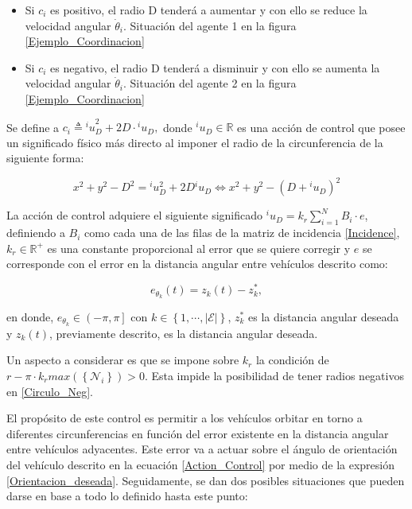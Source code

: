 \begin{itemize}
	\item Si $c_i$ es positivo, el radio D tenderá a aumentar y con ello se reduce la velocidad angular $\dot{\theta}_i$. Situación del agente 1 en la figura \ref{Ejemplo_Coordinacion}
	\item Si $c_i$ es negativo, el radio D tenderá a disminuir y con ello se aumenta la velocidad angular $\dot{\theta}_i$. Situación del agente 2 en la figura \ref{Ejemplo_Coordinacion}
\end{itemize}
\newpage
Se define a $c_i\triangleq{^{i}u}_{D}^{2}+2D\cdot{^i}u_{D},$ donde $^{i}u_{D}\in\mathbb{R}$ es una acción de control que posee un significado físico más directo al imponer el radio de la circunferencia de la siguiente forma:

\begin{equation} \label{Circulo_Neg}
	x^2+y^2-D^2={^{i}}u_{D}^{2}+2D{^{i}}u_{D} \Leftrightarrow x^2+y^2-(D+{^{i}}u_{D})^2
\end{equation}

La acción de control adquiere el siguiente significado ${^{i}}{u}_{D}=k_{r}\sum_{i=1}^N{B_i}\cdot{e}$, definiendo a $B_i$ como cada una de las filas de la matriz de incidencia \ref{Incidence}, $k_r\in\mathbb{R}^{+}$ es una constante proporcional al error que se quiere corregir y $e$ se corresponde con el error en la distancia angular entre vehículos descrito como: 

\begin{equation} \label{Error_Coordinacion}
	e_{\theta_{k}}\left(t\right)=z_{k}\left(t\right)-z_{k}^{*},
\end{equation}

en donde, $e_{\theta_{k}}\in\left(-\pi,\pi\right]$ con $k\in\left\lbrace{1,\cdots,|\mathcal{E}|}\right\rbrace$, $z_{k}^{*}$ es la distancia angular deseada y $z_{k}\left(t\right)$, previamente descrito, es la distancia angular deseada.

Un aspecto a considerar es que se impone sobre $k_{r}$ la condición de $r-\pi\cdot{k_{r}}max\left(\left\lbrace\mathcal{N}_{i}\right\rbrace\right)>0$. Esta impide la posibilidad de tener radios negativos en \ref{Circulo_Neg}.

El propósito de este control es permitir a los vehículos orbitar en torno a diferentes circunferencias en función del error existente en la distancia angular entre vehículos adyacentes. Este error va a actuar sobre el ángulo de orientación del vehículo descrito en la ecuación \ref{Action_Control} por medio de la expresión \ref{Orientacion_deseada}. Seguidamente, se dan dos posibles situaciones que pueden darse en base a todo lo definido hasta este punto:

